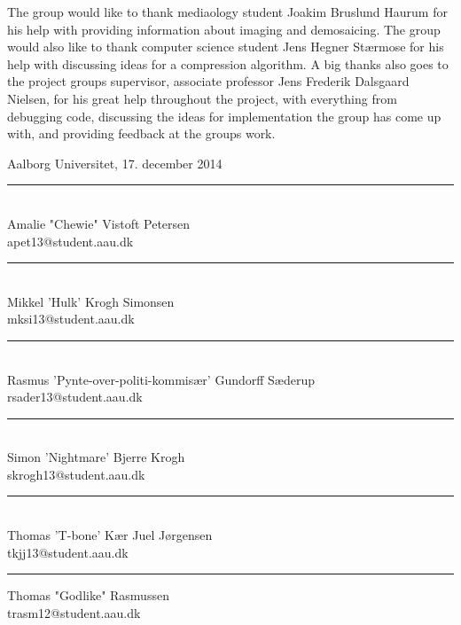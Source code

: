 The group would like to thank mediaology student Joakim Bruslund Haurum for his help with providing information about imaging and demosaicing. The group would also like to thank computer science student Jens Hegner Stærmose for his help with discussing ideas for a compression algorithm. 
A big thanks also goes to the project groups supervisor, associate professor Jens Frederik Dalsgaard Nielsen, for his great help throughout the project, with everything from debugging code, discussing the ideas for implementation the group has come up with, and providing feedback at the groups work.

\vspace{0.5\baselineskip}\hfill Aalborg Universitet, 17. december 2014

\vfill

\begin{minipage}[b]{0.45\textwidth}
 \centering
 \rule{\textwidth}{0.5pt}\\
  Amalie "Chewie" Vistoft Petersen\\
 {\footnotesize apet13@student.aau.dk}
\end{minipage}
\vspace{2\baselineskip}
\hfill
\begin{minipage}[b]{0.45\textwidth}
 \centering
 \rule{\textwidth}{0.5pt}\\
  Mikkel 'Hulk' Krogh Simonsen\\
 {\footnotesize mksi13@student.aau.dk}
\end{minipage}
\vspace{1.5\baselineskip}
\hfill
\begin{minipage}[b]{0.45\textwidth}
 \centering
 \rule{\textwidth}{0.5pt}\\
  Rasmus 'Pynte-over-politi-kommisær' Gundorff Sæderup\\
 {\footnotesize rsader13@student.aau.dk}
\end{minipage}
\vspace{2\baselineskip}
\hfill
\begin{minipage}[b]{0.45\textwidth}
 \centering
 \rule{\textwidth}{0.5pt}\\
  Simon 'Nightmare' Bjerre Krogh\\
 {\footnotesize skrogh13@student.aau.dk}
\end{minipage}
\vspace{2\baselineskip}
\hfill
\begin{minipage}[b]{0.45\textwidth}
 \centering
 \rule{\textwidth}{0.5pt}\\
  Thomas 'T-bone' Kær Juel Jørgensen\\
 {\footnotesize tkjj13@student.aau.dk}
\end{minipage}
\vspace{2\baselineskip}
\hfill
\begin{minipage}[b]{0.45\textwidth}
 \centering
 \rule{\textwidth}{0.5pt}
  Thomas "Godlike" Rasmussen\\
 {\footnotesize trasm12@student.aau.dk}
\end{minipage}